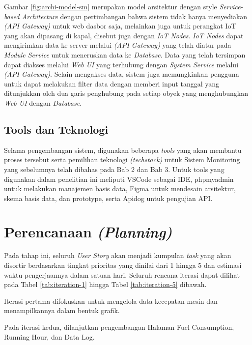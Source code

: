 Gambar \ref{fig:archi-model-sm} merupakan model arsitektur dengan style \textit{Service-based Architecture} dengan pertimbangan bahwa sistem tidak hanya menyediakan \textit{(API Gateway)} untuk web dasbor saja, melainkan juga untuk perangkat IoT yang akan dipasang di kapal, disebut juga dengan \textit{IoT Nodes}. \textit{IoT Nodes} dapat mengirimkan data ke server melalui \textit{(API Gateway)} yang telah diatur pada \textit{Module Service} untuk meneruskan data ke \textit{Database}. Data yang telah tersimpan dapat diakses melalui \textit{Web UI} yang terhubung dengan \textit{System Service} melalui \textit{(API Gateway)}. Selain mengakses data, sistem juga memungkinkan pengguna untuk dapat melakukan filter data dengan memberi input tanggal yang ditunjukkan oleh dua garis penghubung pada setiap obyek yang menghubungkan \textit{Web UI} dengan \textit{Database}.

\subsection{Tools dan Teknologi}

Selama pengembangan sistem, digunakan beberapa \textit{tools} yang akan membantu proses tersebut serta pemilihan teknologi \textit{(techstack)} untuk Sistem Monitoring yang sebelumnya telah dibahas pada Bab 2 dan Bab 3. Untuk tools yang digunakan dalam penelitian ini meliputi VSCode sebagai IDE, phpmyadmin untuk melakukan manajemen basis data, Figma untuk mendesain arsitektur, skema basis data, dan prototype, serta Apidog untuk pengujian API.

\section{Perencanaan \textit{(Planning)}}

Pada tahap ini, seluruh \textit{User Story} akan menjadi kumpulan \textit{task} yang akan disortir berdasarkan tingkat prioritas yang dinilai dari 1 hingga 5 dan estimasi waktu pengerjaannya dalam satuan hari. Seluruh rencana iterasi dapat dilihat pada Tabel \ref{tab:iteration-1} hingga Tabel \ref{tab:iteration-5} dibawah.

Iterasi pertama difokuskan untuk mengelola data kecepatan mesin dan menampilkannya dalam bentuk grafik.



Pada iterasi kedua, dilanjutkan pengembangan Halaman Fuel Consumption, Running Hour, dan Data Log.

